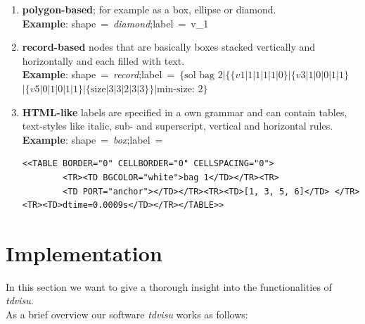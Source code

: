 \documentclass[a4paper, 12pt, bibliography=totoc]{scrartcl}
\begin{document}
\begin{enumerate}[label=(\arabic*)]
	\item \textbf{polygon-based}; for example as a box, ellipse or diamond.\vspace{10pt}\\		
	\textbf{Example}: shape~=~\textit{diamond};\quad label~=~v\_1
	
	\item \textbf{record-based} nodes that are basically boxes stacked vertically and horizontally and each filled with text.\vspace{10pt}\\
	\textbf{Example}: shape~=~\textit{record};\quad label~=~$\{\text{sol bag 2}|\{\{v1|1|1|1|1|0\}|\{v3|1|0|0|1|1\}$ \\
	\hspace*{0pt}\hfill $|\{v5|0|1|0|1|1\}|
	\{\text{size}|3|3|2|3|3\}\}|\text{min-size: 2}\}$
	
	\item \textbf{HTML-like} labels are specified in a own grammar and can contain tables, text-styles like italic, sub- and superscript, vertical and horizontal rules.\vspace{10pt}\\		
	\textbf{Example}: shape~=~\textit{box};\quad label~=
	\begin{lstlisting}[xleftmargin=0.5cm, xrightmargin=1.5cm, framexleftmargin=5pt]
		<<TABLE BORDER="0" CELLBORDER="0" CELLSPACING="0">
		<TR><TD BGCOLOR="white">bag 1</TD></TR><TR>
		<TD PORT="anchor"></TD></TR><TR><TD>[1, 3, 5, 6]</TD> </TR><TR><TD>dtime=0.0009s</TD></TR></TABLE>>
	\end{lstlisting}
	
\end{enumerate}



\newpage
\section{Implementation}\label{sec:project}

In this section we want to give a thorough insight into the functionalities of \textit{tdvisu}.\\

\noindent As a brief overview our software \textit{tdvisu} works as follows:
\end{document}
